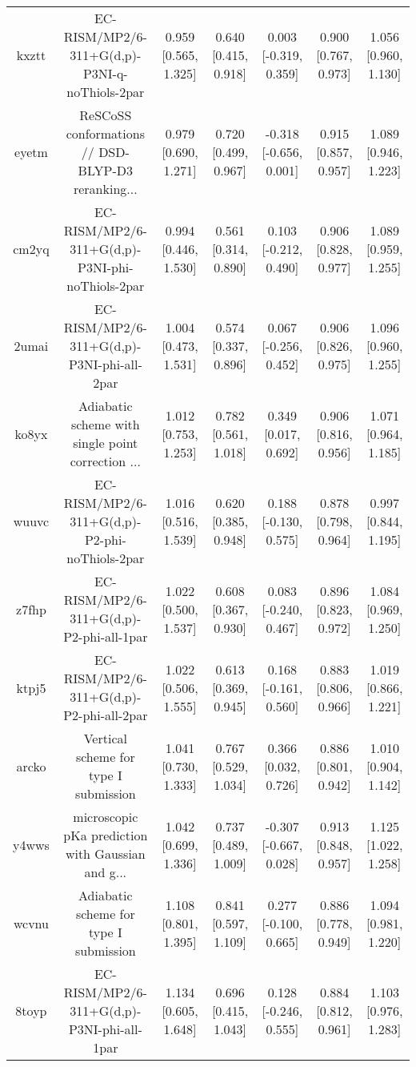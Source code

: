 \documentclass{article}
\begin{document}
\begin{center}
\begin{longtable}{|ccccccc|}
 kxztt &      EC-RISM/MP2/6-311+G(d,p)-P3NI-q-noThiols-2par &  0.959 [0.565, 1.325] &  0.640 [0.415, 0.918] &   0.003 [-0.319, 0.359] &  0.900 [0.767, 0.973] &   1.056 [0.960, 1.130] \\
 eyetm &  ReSCoSS conformations // DSD-BLYP-D3 reranking... &  0.979 [0.690, 1.271] &  0.720 [0.499, 0.967] &  -0.318 [-0.656, 0.001] &  0.915 [0.857, 0.957] &   1.089 [0.946, 1.223] \\
 cm2yq &    EC-RISM/MP2/6-311+G(d,p)-P3NI-phi-noThiols-2par &  0.994 [0.446, 1.530] &  0.561 [0.314, 0.890] &   0.103 [-0.212, 0.490] &  0.906 [0.828, 0.977] &   1.089 [0.959, 1.255] \\
 2umai &         EC-RISM/MP2/6-311+G(d,p)-P3NI-phi-all-2par &  1.004 [0.473, 1.531] &  0.574 [0.337, 0.896] &   0.067 [-0.256, 0.452] &  0.906 [0.826, 0.975] &   1.096 [0.960, 1.255] \\
 ko8yx &  Adiabatic scheme with single point correction ... &  1.012 [0.753, 1.253] &  0.782 [0.561, 1.018] &    0.349 [0.017, 0.692] &  0.906 [0.816, 0.956] &   1.071 [0.964, 1.185] \\
 wuuvc &      EC-RISM/MP2/6-311+G(d,p)-P2-phi-noThiols-2par &  1.016 [0.516, 1.539] &  0.620 [0.385, 0.948] &   0.188 [-0.130, 0.575] &  0.878 [0.798, 0.964] &   0.997 [0.844, 1.195] \\
 z7fhp &           EC-RISM/MP2/6-311+G(d,p)-P2-phi-all-1par &  1.022 [0.500, 1.537] &  0.608 [0.367, 0.930] &   0.083 [-0.240, 0.467] &  0.896 [0.823, 0.972] &   1.084 [0.969, 1.250] \\
 ktpj5 &           EC-RISM/MP2/6-311+G(d,p)-P2-phi-all-2par &  1.022 [0.506, 1.555] &  0.613 [0.369, 0.945] &   0.168 [-0.161, 0.560] &  0.883 [0.806, 0.966] &   1.019 [0.866, 1.221] \\
 arcko &              Vertical scheme for type I submission &  1.041 [0.730, 1.333] &  0.767 [0.529, 1.034] &    0.366 [0.032, 0.726] &  0.886 [0.801, 0.942] &   1.010 [0.904, 1.142] \\
 y4wws &  microscopic pKa prediction with Gaussian and g... &  1.042 [0.699, 1.336] &  0.737 [0.489, 1.009] &  -0.307 [-0.667, 0.028] &  0.913 [0.848, 0.957] &   1.125 [1.022, 1.258] \\
 wcvnu &             Adiabatic scheme for type I submission &  1.108 [0.801, 1.395] &  0.841 [0.597, 1.109] &   0.277 [-0.100, 0.665] &  0.886 [0.778, 0.949] &   1.094 [0.981, 1.220] \\
 8toyp &         EC-RISM/MP2/6-311+G(d,p)-P3NI-phi-all-1par &  1.134 [0.605, 1.648] &  0.696 [0.415, 1.043] &   0.128 [-0.246, 0.555] &  0.884 [0.812, 0.961] &   1.103 [0.976, 1.283] \\

\end{longtable}
\end{center}
\end{document}
